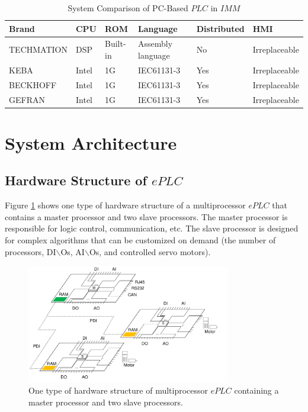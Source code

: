 \documentclass[journal,UTF8]{IEEEtran}
\begin{document}
\begin{table}
	\scriptsize \caption{System Comparison of PC-Based $PLC$ in $IMM$}
	\label{table:IMMControllor}
	\begin{center}
		\renewcommand{\arraystretch}{1.4}
		\setlength\tabcolsep{3pt}
		\begin{tabular}{|p{1.6cm}|p{0.5cm}|p{0.8cm}|p{2cm}|p{1.1cm}|p{1.3cm}|}
			\hline
			Brand       & CPU    & ROM & Language       & Distributed  & HMI\\
			\hline
			TECHMATION  & DSP    & Built-in  & Assembly language        &No  & Irreplaceable \\
			\hline
			KEBA        & Intel  & 1G  & IEC61131-3                 &Yes    & Irreplaceable\\
			\hline
			BECKHOFF    & Intel  & 1G  & IEC61131-3               &Yes   &Irreplaceable\\
			\hline
			GEFRAN      & Intel  & 1G  &IEC61131-3                 &Yes   &Irreplaceable\\
			\hline
		\end{tabular}
	\end{center}
\end{table}
\section{System Architecture}
\label{MultiProcessorePLC}
\subsection{Hardware Structure of $ePLC$}
Figure \ref{fig:HardwareStructure} shows one type of hardware structure of a multiprocessor $ePLC$ that contains a master processor and two slave processors. The master processor is responsible for logic control, communication, etc. The slave processor is designed for complex algorithms that can be customized on demand (the number of processors, DI$\backslash$Os, AI$\backslash$Os, and controlled servo motors).
\begin{figure}
	\centering
	\includegraphics[width=3.5in]{fig/FIG2.pdf}
	\caption{ One type of hardware structure of multiprocessor $ePLC$ containing a master processor and two slave processors.}
	\label{fig:HardwareStructure}
\end{figure}
\end{document}
